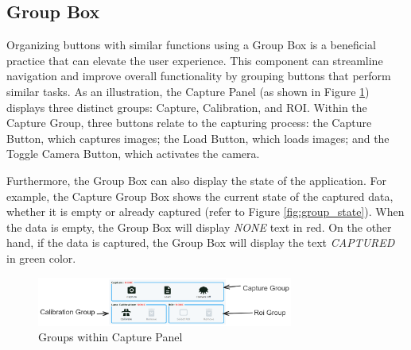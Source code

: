 \subsection{Group Box}

Organizing buttons with similar functions using a Group Box is a beneficial practice that can elevate the user experience. This component can streamline navigation and improve overall functionality by grouping buttons that perform similar tasks. As an illustration, the Capture Panel (as shown in Figure \ref{fig:group_example}) displays three distinct groups: Capture, Calibration, and ROI. Within the Capture Group, three buttons relate to the capturing process: the Capture Button, which captures images; the Load Button, which loads images; and the Toggle Camera Button, which activates the camera.

Furthermore, the Group Box can also display the state of the application. For example, the Capture Group Box shows the current state of the captured data, whether it is empty or already captured (refer to Figure \ref{fig:group_state}). When the data is empty, the Group Box will display \textit{NONE} text in red. On the other hand, if the data is captured, the Group Box will display the text \textit{CAPTURED} in green color.

\begin{figure}[!ht]
    \centering
    \includegraphics[width=0.75\textwidth]{texs/Part2/chapter4/image/groupexample.png}
    \caption{Groups within Capture Panel}
    \label{fig:group_example}
\end{figure}

